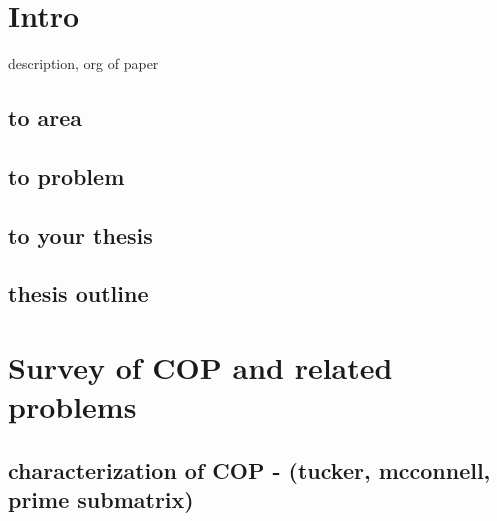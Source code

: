 

\newtheorem{theorem}{Theorem}[section]
\newtheorem{lemma}[theorem]{Lemma}
\newtheorem{proposition}[theorem]{Proposition}
\newtheorem{corollary}[theorem]{Corollary} \newtheorem{fact}{Fact}
\newenvironment{proof}{Proof:}{$\Box$}
\newtheorem{definition}{Definition}[section]






  
 

\tableofcontents
\listoffigures

\chapter{Intro}
description, org of paper
\section{to area}
\section{to problem}
\section{to your thesis}
\section{thesis outline}


   
\chapter{Survey of COP and related problems}

\section{characterization of COP - (tucker, mcconnell, prime submatrix)}
